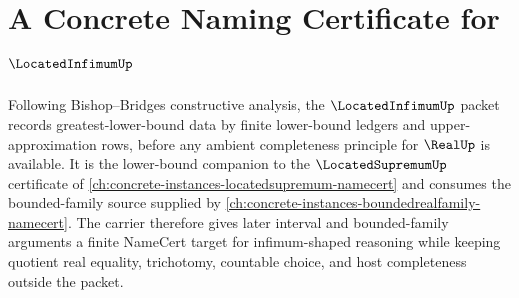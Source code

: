 \chapter{A Concrete Naming Certificate for $\LocatedInfimumUp$}
\label{ch:concrete-instances-locatedinfimum-namecert}

Following Bishop--Bridges constructive analysis, the $\LocatedInfimumUp$ packet records greatest-lower-bound data by finite lower-bound ledgers and upper-approximation rows, before any ambient completeness principle for $\RealUp$ is available. It is the lower-bound companion to the $\LocatedSupremumUp$ certificate of \autoref{ch:concrete-instances-locatedsupremum-namecert} and consumes the bounded-family source supplied by \autoref{ch:concrete-instances-boundedrealfamily-namecert}. The carrier therefore gives later interval and bounded-family arguments a finite NameCert target for infimum-shaped reasoning while keeping quotient real equality, trichotomy, countable choice, and host completeness outside the packet.

